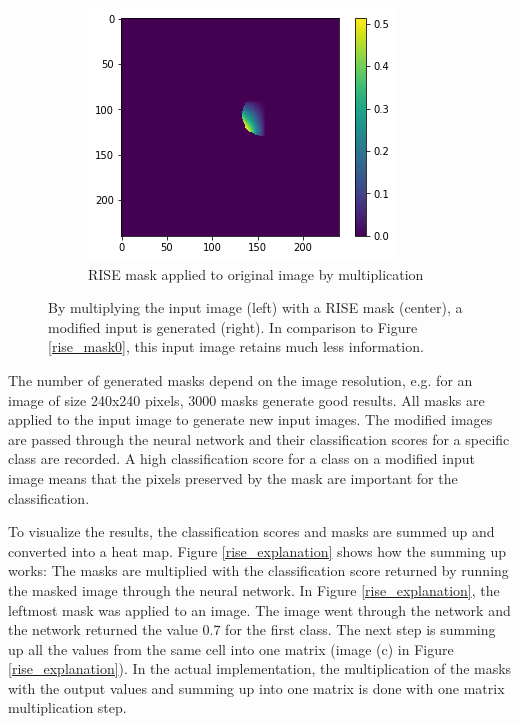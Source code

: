 \begin{figure}[H]
\begin{subfigure}[t]{.32\textwidth}
    \end{subfigure}\hfill%
    \begin{subfigure}[t]{.32\textwidth}
        \centering
        \includegraphics[width=\linewidth]{chapters/02_methods/images/rise/rise1_applied.png}
        \caption{RISE mask applied to original image by multiplication}
    \end{subfigure}
    \caption{By multiplying the input image (left) with a RISE mask (center), a modified input is generated (right). In comparison to Figure \ref{rise_mask0}, this input image retains much less information.}
    \label{rise_mask1}
\end{figure}

The number of generated masks depend on the image resolution, e.g. for an image of size 240x240 pixels, 3000 masks generate good results. All masks are applied to the input image to generate new input images. The modified images are passed through the neural network and their classification scores for a specific class are recorded. A high classification score for a class on a modified input image means that the pixels preserved by the mask are important for the classification.

To visualize the results, the classification scores and masks are summed up and converted into a heat map. Figure \ref{rise_explanation} shows how the summing up works: The masks are multiplied with the classification score returned by running the masked image through the neural network. In Figure \ref{rise_explanation}, the leftmost mask was applied to an image. The image went through the network and the network returned the value 0.7 for the first class. The next step is summing up all the values from the same cell into one matrix (image (c) in Figure \ref{rise_explanation}). In the actual implementation, the multiplication of the masks with the output values and summing up into one matrix is done with one matrix multiplication step.

